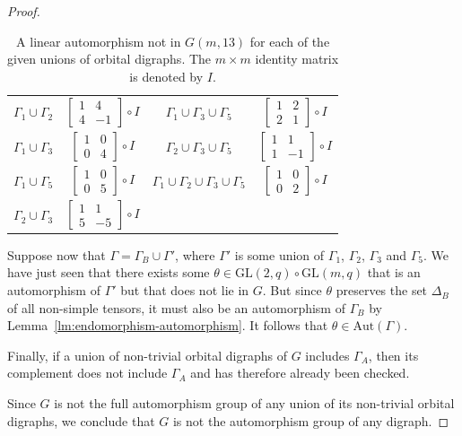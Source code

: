 \documentclass[ALCO, Unicode]{cedram}
\newcommand{\Aut}{\mathrm{Aut}}
\newcommand{\GL}{\mathrm{GL}}
\begin{document}
\begin{proof}
\begin{table}
\begin{tabular}{cc||cc}
\vphantom{\Bigg(} $\Gamma_1 \cup \Gamma_2$ & $\begin{bmatrix} 1 & 4 \\ 4 & -1 \end{bmatrix} \circ I$ & $\Gamma_1 \cup \Gamma_3 \cup \Gamma_5$ & $\begin{bmatrix} 1 & 2 \\ 2 & 1 \end{bmatrix} \circ I$ \\
\vphantom{\Bigg(} $\Gamma_1 \cup \Gamma_3$ & $\begin{bmatrix} 1 & 0 \\ 0 & 4 \end{bmatrix} \circ I$ & $\Gamma_2 \cup \Gamma_3 \cup \Gamma_5$ & $\begin{bmatrix} 1 & 1 \\ 1 & -1 \end{bmatrix} \circ I$ \\
\vphantom{\Bigg(} $\Gamma_1 \cup \Gamma_5$ & $\begin{bmatrix} 1 & 0 \\ 0 & 5 \end{bmatrix} \circ I$ & $\Gamma_1 \cup \Gamma_2 \cup \Gamma_3 \cup \Gamma_5$ & $\begin{bmatrix} 1 & 0 \\ 0 & 2 \end{bmatrix} \circ I$ \\
\vphantom{\Bigg(} $\Gamma_2 \cup \Gamma_3$ & $\begin{bmatrix} 1 & 1 \\ 5 & -5 \end{bmatrix} \circ I$ \\
\hline
\end{tabular}
\caption{A linear automorphism not in $G{\left(m, 13 \right)}$ for each of the given unions of orbital digraphs. The $m \times m$ identity matrix is denoted by $I$.}
\label{tbl:q=13,endomorphisms}
\end{table}

Suppose now that $\Gamma = \Gamma_B \cup \Gamma'$, where $\Gamma'$ is some union of $\Gamma_1$, $\Gamma_2$, $\Gamma_3$ and $\Gamma_5$. We have just seen that there exists some $\theta \in \GL{\left(2, q \right)} \circ \GL{\left(m, q \right)}$ that is an automorphism of $\Gamma'$ but that does not lie in $G$. But since $\theta$ preserves the set $\Delta_B$ of all non-simple tensors, it must also be an automorphism of $\Gamma_B$ by Lemma~\ref{lm:endomorphism-automorphism}. It follows that $\theta \in \Aut{\left(\Gamma \right)}$.

Finally, if a union of non-trivial orbital digraphs of $G$ includes $\Gamma_A$, then its complement does not include $\Gamma_A$ and has therefore already been checked.

Since $G$ is not the full automorphism group of any union of its non-trivial orbital digraphs, we conclude that $G$ is not the automorphism group of any digraph.
\end{proof}
\end{document}
